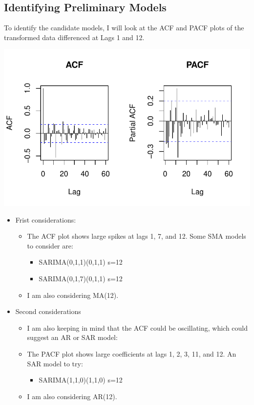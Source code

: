 \documentclass[
  letterpaper,
  DIV=11,
  numbers=noendperiod]{scrartcl}
\providecommand{\tightlist}{%
  \setlength{\itemsep}{0pt}\setlength{\parskip}{0pt}}\usepackage{longtable,booktabs,array}
\begin{document}
\hypertarget{identifying-preliminary-models}{%
\subsection{Identifying Preliminary
Models}\label{identifying-preliminary-models}}

To identify the candidate models, I will look at the ACF and PACF plots
of the transformed data differenced at Lags 1 and 12.

\includegraphics{Final_Project_files/figure-pdf/unnamed-chunk-16-1.pdf}

\begin{itemize}
\item
  Frist considerations:

  \begin{itemize}
  \item
    The ACF plot shows large spikes at lags 1, 7, and 12. Some SMA
    models to consider are:

    \begin{itemize}
    \item
      SARIMA(0,1,1)(0,1,1) s=12
    \item
      SARIMA(0,1,7)(0,1,1) s=12
    \end{itemize}
  \item
    I am also considering MA(12).
  \end{itemize}
\item
  Second considerations

  \begin{itemize}
  \item
    I am also keeping in mind that the ACF could be oscillating, which
    could suggest an AR or SAR model:
  \item
    The PACF plot shows large coefficients at lags 1, 2, 3, 11, and 12.
    An SAR model to try:

    \begin{itemize}
    \tightlist
    \item
      SARIMA(1,1,0)(1,1,0) s=12
    \end{itemize}
  \item
    I am also considering AR(12).
  \end{itemize}
\end{itemize}
\end{document}
